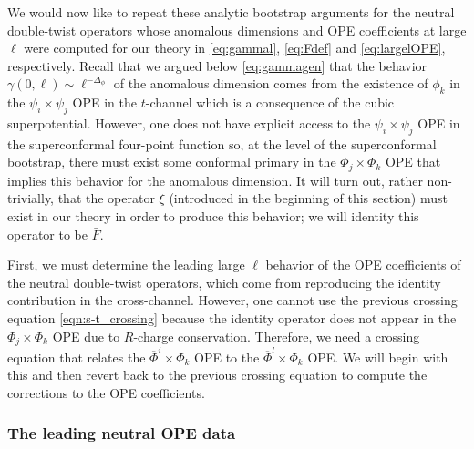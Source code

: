 \documentclass[11pt]{article}
\newcommand{\Phib}{\overline{\Phi}}
\newcommand{\Fb}{\bar{F}}
\begin{document}
We would now like to repeat these analytic bootstrap arguments for the neutral double-twist operators whose anomalous dimensions and OPE coefficients at large $\ell$ were computed for our theory in \eqref{eq:gammal}, \eqref{eq:Fdef} and \eqref{eq:largelOPE}, respectively. Recall that we argued below \eqref{eq:gammagen} that the behavior $\gamma(0,\ell) \sim \ell^{-\Delta_{\phi}}$ of the anomalous dimension comes from the existence of $\phi_{k}$ in the $\psi_{i} \times \psi_{j}$ OPE in the $t$-channel which is a consequence of the cubic superpotential. However, one does not have explicit access to the $\psi_i \times \psi_j$ OPE in the superconformal four-point function so, at the level of the superconformal bootstrap, there must exist some conformal primary in the $\Phi_j \times \Phi_k$ OPE that implies this behavior for the anomalous dimension. It will turn out, rather non-trivially, that the operator $\xi$ (introduced in the beginning of this section) must exist in our theory in order to produce this behavior; we will identity this operator to be $\Fb$. 

First, we must determine the leading large $\ell$ behavior of the OPE coefficients of the neutral double-twist operators, which come from reproducing the identity contribution in the cross-channel. However, one cannot use the previous crossing equation \eqref{eqn:s-t_crossing} because the identity operator does not appear in the $\Phi_j \times \Phi_k$ OPE due to $R$-charge conservation. Therefore, we need a crossing equation that relates the $\Phib^i \times \Phi_k$ OPE to the $\Phib^l \times \Phi_k$ OPE.  We will begin with this and then revert back to the previous crossing equation to compute the corrections to the OPE coefficients. 

\subsubsection{The leading neutral OPE data}
\label{sec:nOPE1}
\end{document}
